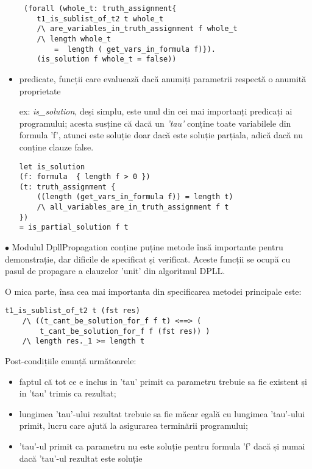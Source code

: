 \begin{itemize}
	\begin{lstlisting}
 (forall (whole_t: truth_assignment{ 
	t1_is_sublist_of_t2 t whole_t
	/\ are_variables_in_truth_assignment f whole_t 
	/\ length whole_t 
		=  length ( get_vars_in_formula f)}). 
	(is_solution f whole_t = false)) 
	\end{lstlisting}
	
	
	\item predicate, funcții care evaluează dacă anumiți parametrii respectă o anumită proprietate
	
	ex: \textit{is\_solution}, deși simplu, este unul din cei mai importanți predicați ai \newline programului; acesta susține că dacă un \textit{'tau'} conține toate variabilele din formula 'f', atunci este soluție doar dacă este soluție parțiala, adică dacă nu conține clauze false.
	
	\begin{lstlisting}
let is_solution 
(f: formula  { length f > 0 })
(t: truth_assignment {
	((length (get_vars_in_formula f)) = length t)
	/\ all_variables_are_in_truth_assignment f t  
})
= is_partial_solution f t 
	\end{lstlisting}

\end{itemize}


$\bullet$ Modulul DpllPropagation conține puține metode însă importante pentru demonstrație, dar dificile de specificat și verificat. Aceste funcții se ocupă cu pasul de propagare a clauzelor 'unit' din algoritmul DPLL.

O mica parte, însa cea mai importanta din specificarea metodei principale este:

\begin{lstlisting}[]
	t1_is_sublist_of_t2 t (fst res)
	/\ ((t_cant_be_solution_for_f f t) <==> (    
		t_cant_be_solution_for_f f (fst res)) )
 	/\ length res._1 >= length t

\end{lstlisting}
	
Post-condițiile enunță următoarele: 
\begin{itemize}
	\item  faptul că tot ce e inclus in 'tau' primit ca parametru trebuie sa fie existent și in 'tau' trimis ca rezultat; 
	
	\item lungimea 'tau'-ului rezultat trebuie sa fie măcar egală cu lungimea 'tau'-ului primit, lucru care ajută la asigurarea terminării programului;
	
	\item 'tau'-ul primit ca parametru nu este soluție pentru formula 'f' dacă și numai dacă 'tau'-ul rezultat este soluție
\end{itemize}

